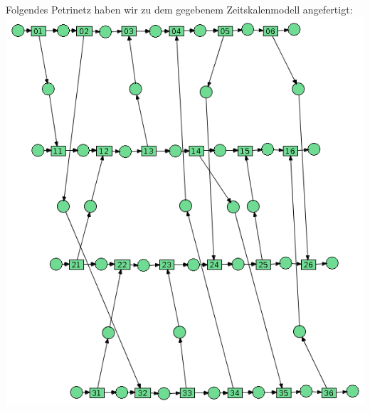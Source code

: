 \subsection{}
Folgendes Petrinetz haben wir zu dem gegebenem Zeitskalenmodell angefertigt:
\includegraphics[scale=0.5]{./b06_a636.png}